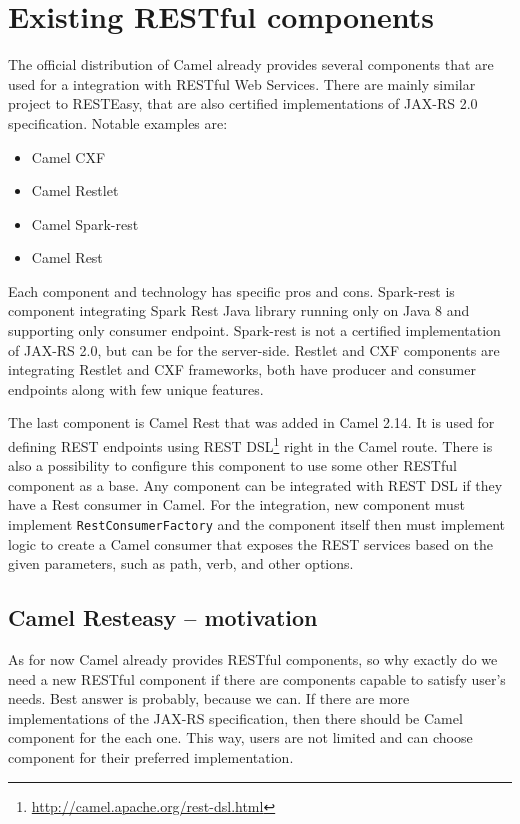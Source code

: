 \documentclass[12pt,final,oneside]{fithesis2}
\begin{document}


\section{Existing RESTful components}
The official distribution of Camel already provides several components that are used for a integration with RESTful Web Services. There are mainly similar project to RESTEasy, that are also certified implementations of JAX-RS 2.0 specification. Notable examples are:
\begin{itemize}
\item
Camel CXF

\item
Camel Restlet

\item
Camel Spark-rest

\item
Camel Rest
\end{itemize}

Each component and technology has specific pros and cons. Spark-rest is component integrating Spark Rest Java library running only on Java 8 and supporting only consumer endpoint. Spark-rest is not a certified implementation of JAX-RS 2.0, but can be for the server-side. Restlet and CXF components are integrating Restlet and CXF frameworks, both have producer and consumer endpoints along with few unique features. 

The last component is Camel Rest that was added in Camel 2.14. It is used for defining REST endpoints using REST DSL\footnote{\url{http://camel.apache.org/rest-dsl.html}} right in the Camel route. There is also a possibility to configure this component to use some other RESTful component as a base. Any component can be integrated with REST DSL if they have a Rest consumer in Camel. For the integration, new component must implement \texttt{RestConsumerFactory} and the component itself then must implement logic to create a Camel consumer that exposes the REST services based on the given parameters, such as path, verb, and other options.

\subsection{Camel Resteasy -- motivation}
As for now Camel already provides RESTful components, so why exactly do we need a new RESTful component if there are components capable to satisfy user's needs. Best answer is probably, because we can. If there are more implementations of the JAX-RS specification, then there should be Camel component for the each one. This way, users are not limited and can choose component for their preferred implementation. 
\end{document}
